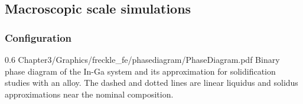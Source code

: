 \subsection{Macroscopic scale simulations}
%
\subsubsection{Configuration}
%
\begin{figureth}
{0.6}
{Chapter3/Graphics/freckle_fe/phasediagram/PhaseDiagram.pdf}
{Binary phase diagram of the In-Ga system \citep{andersson_thermo-calc_2002,tcbin_tcbin:_2006} and its approximation for solidification studies with an  alloy. 
The dashed and dotted lines are linear liquidus and solidus approximations near the nominal composition.}
\label{fig:phasediagram_InGa}
\end{figureth}
%
